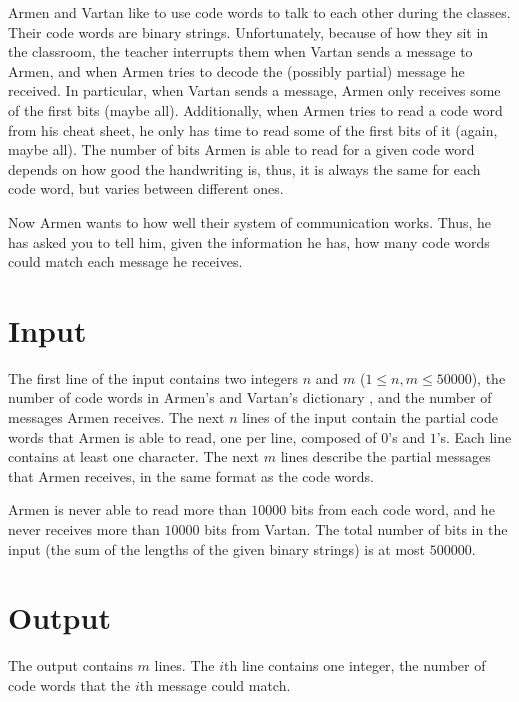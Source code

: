 
Armen and Vartan like to use code words to talk to each other during the classes.
Their code words are binary strings.
Unfortunately, because of how they sit in the classroom, the teacher interrupts them when Vartan sends a message to Armen, and when Armen tries to decode the (possibly partial) message he received.
In particular, when Vartan sends a message, Armen only receives some of the first bits (maybe all).
Additionally, when Armen tries to read a code word from his cheat sheet, he only has time to read some of the first bits of it (again, maybe all).
The number of bits Armen is able to read for a given code word depends on how good the handwriting is, thus, it is always the same for each code word, but varies between different ones.

Now Armen wants to how well their system of communication works.
Thus, he has asked you to tell him, given the information he has, how many code words could match each message he receives.

\section*{Input}
The first line of the input contains two integers $n$ and $m$ ($1 \leq n, m \leq 50000$), the number of code words in Armen's and Vartan's dictionary , and the number of messages Armen receives.
The next $n$ lines of the input contain the partial code words that Armen is able to read, one per line, composed of $0$'s and $1$'s.
Each line contains at least one character.
The next $m$ lines describe the partial messages that Armen receives, in the same format as the code words.

Armen is never able to read more than $10000$ bits from each code word, and he never receives more than $10000$ bits from Vartan.
The total number of bits in the input (the sum of the lengths of the given binary strings) is at most $500000$.

\section*{Output}
The output contains $m$ lines.
The $i$th line contains one integer, the number of code words that the $i$th message could match.
